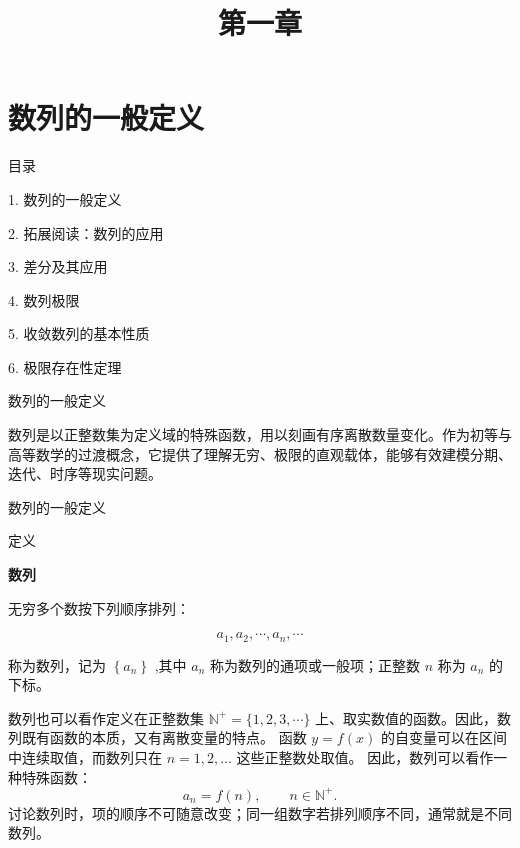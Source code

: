\documentclass[aspectratio=169,10pt,fontset=fandol]{ctexbeamer}
\title{第一章}
\begin{document}
\section{数列的一般定义}
\begin{frame}[t,fragile]{目录}
\normalsize
{\color{blue}\normalsize 1. 数列的一般定义\par}\vspace{0.22em}
{\color{gray!40}\normalsize 2. 拓展阅读：数列的应用\par}\vspace{0.22em}
{\color{gray!40}\normalsize 3. 差分及其应用\par}\vspace{0.22em}
{\color{gray!40}\normalsize 4. 数列极限\par}\vspace{0.22em}
{\color{gray!40}\normalsize 5. 收敛数列的基本性质\par}\vspace{0.22em}
{\color{gray!40}\normalsize 6. 极限存在性定理\par}\vspace{0.22em}
\end{frame}
\begin{frame}[t,fragile]{数列的一般定义}
\normalsize
{\normalsize
数列是以正整数集为定义域的特殊函数，用以刻画有序离散数量变化。作为初等与高等数学的过渡概念，它提供了理解无穷、极限的直观载体，能够有效建模分期、迭代、时序等现实问题。


}
\end{frame}
\begin{frame}[t,fragile]{数列的一般定义}
\footnotesize
\begin{block}{定义}
{\footnotesize
\textbf{数列}\par

无穷多个数按下列顺序排列：

$$
a_1, a_2, \cdots, a_n, \cdots
$$

称为数列，记为 $\left\{a_n\right\}$ ,其中 $a_n$ 称为数列的通项或一般项；正整数 $n$ 称为 $a_n$ 的下标。

数列也可以看作定义在正整数集 $\mathbb{N}^+=\{1,2,3,\cdots\}$ 上、取实数值的函数。因此，数列既有函数的本质，又有离散变量的特点。 函数 $y=f(x)$ 的自变量可以在区间中连续取值，而数列只在 $n=1,2,\ldots$ 这些正整数处取值。 因此，数列可以看作一种特殊函数：
\[
a_n=f(n),\qquad n\in\mathbb{N}^+.
\]
讨论数列时，项的顺序不可随意改变；同一组数字若排列顺序不同，通常就是不同数列。

}
\end{block}
\end{frame}
\end{document}
